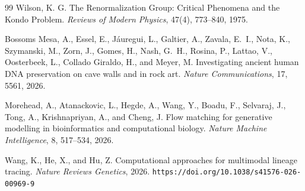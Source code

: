 \documentclass[12pt,oneside]{article}
\theoremstyle{definition}
\begin{document}
\begin{thebibliography}{99}
Wilson, K. G.
The Renormalization Group: Critical Phenomena and the Kondo Problem.
\textit{Reviews of Modern Physics},
47(4), 773--840, 1975.

Bossoms Mesa, A., Essel, E., J\'{a}uregui, L., Galtier, A., Zavala, E.~I.,
Nota, K., Szymanski, M., Zorn, J., Gomes, H., Nash, G.~H., Rosina, P.,
Lattao, V., Oosterbeek, L., Collado Giraldo, H., and Meyer, M.
Investigating ancient human DNA preservation on cave walls and in rock art.
\textit{Nature Communications},
17, 5561, 2026.

Morehead, A., Atanackovic, L., Hegde, A., Wang, Y., Boadu, F., Selvaraj, J.,
Tong, A., Krishnapriyan, A., and Cheng, J.
Flow matching for generative modelling in bioinformatics and computational biology.
\textit{Nature Machine Intelligence},
8, 517--534, 2026.

Wang, K., He, X., and Hu, Z.
Computational approaches for multimodal lineage tracing.
\textit{Nature Reviews Genetics},
2026. \texttt{https://doi.org/10.1038/s41576-026-00969-9}

\end{thebibliography}
\end{document}
